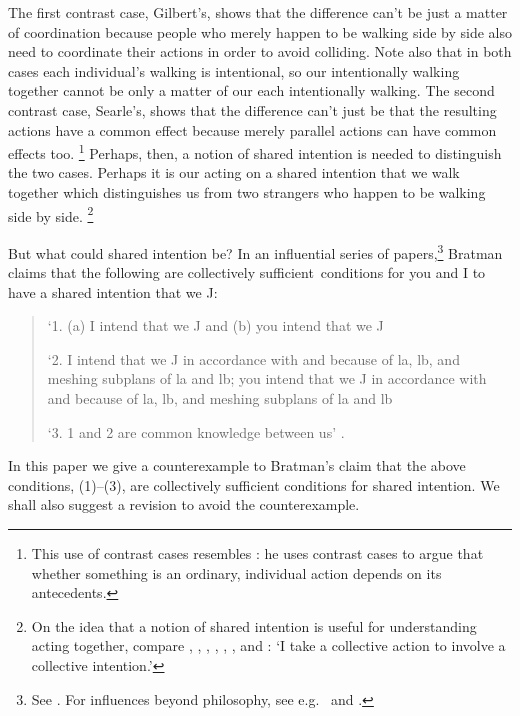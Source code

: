 \documentclass[12pt,\papersize]{extarticle}
\begin{document}
The first contrast case, Gilbert's, shows that the difference can’t be just  a matter of coordination because people who merely happen to be walking side by side  also need to coordinate their actions in order to avoid colliding.  
Note also that in both cases each individual's walking is intentional, so our intentionally walking together cannot be  only a matter of our each intentionally walking.
The second contrast case, Searle's, shows that the difference can’t just be that the resulting actions have a common effect because merely parallel actions can have common effects too.%
\footnote{
This use of contrast cases resembles \citet{Pears:1971fk}: he uses contrast cases to argue that whether something is an ordinary, individual action depends on its antecedents. 
} 
Perhaps, then, a notion of shared intention is needed to distinguish the two cases.  
Perhaps it is our acting on a shared intention that we walk together which distinguishes us from two strangers who happen to be walking side by side.%
\footnote{
On the idea that a notion of shared intention is useful for understanding acting together, compare  
	\citet[p.\ 381]{Carpenter:2009wq}, 
	\citet[p.\ 369]{Call:2009fk}, 
	\citet{Kutz:2000si}, 
	\citet[p.\ 175]{pacherie_framing_2011},
	\citet[p.\ 117]{rakoczy_pretend_2006}, 
	\citet{Tollefsen:2005vh},
and \citet[p.\ 5]{Gilbert:2006wr}: `I take a collective action to involve a collective intention.'  
	}
	

But what could shared intention be?
In an influential series of papers,\footnote{ 
See \citet{Bratman:1992mi,Bratman:1993je,Bratman:1999fr,Bratman:2009lv}.
For influences beyond philosophy, see e.g.\ \citet{Tomasello:2005wx} and \citet{Knoblich:2008hy}. 
}
Bratman claims that the following are collectively sufficient\footnotemark \ conditions for you and I to have a shared intention that we J:
%
%
\begin{quote}
\label{quote:bratman_account}
`1. (a) I intend that we J and (b) you intend that we J
 
`2. I intend that we J in accordance with and because of la, lb, and meshing subplans of la and lb; you intend that we J in accordance with and because of la, lb, and meshing subplans of la and lb
 
`3. 1 and 2 are common knowledge between us' \citep[][p.\ View 4]{Bratman:1993je}.
\end{quote}
%
In this paper we give a counterexample to Bratman's  claim that the above conditions, (1)--(3), are collectively sufficient conditions for shared intention. 
We shall also suggest a revision to avoid the counterexample.
\end{document}
